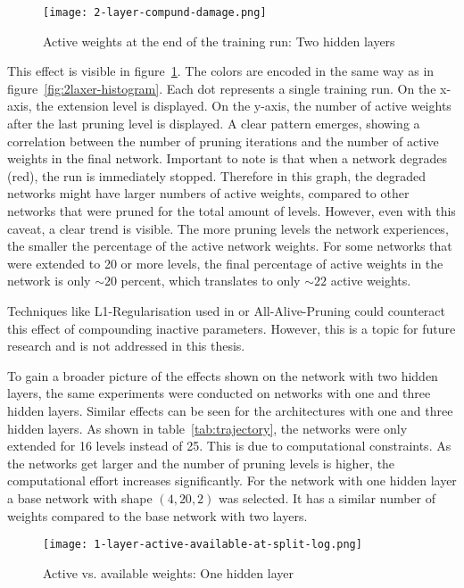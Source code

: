 \begin{figure}[ht]
    \centering
    \texttt{[image: 2-layer-compund-damage.png]}
    \caption{
        Active weights at the end of the training run: Two hidden layers
    }\label{fig:collateral_damage}
\end{figure}

This effect is visible in figure~\ref{fig:collateral_damage}.
The colors are encoded in the same way as in figure~\ref{fig:2laxer-histogram}.
Each dot represents a single training run. 
On the x-axis, the extension level is displayed.
On the y-axis, the number of active weights after the last pruning level is displayed.
A clear pattern emerges, showing a correlation between the number of pruning iterations and the number of active weights in the final network.
Important to note is that when a network degrades (red), the run is immediately stopped.
Therefore in this graph, the degraded networks might have larger numbers of active weights, compared to other networks that were pruned for the total amount of levels.
However, even with this caveat, a clear trend is visible.
The more pruning levels the network experiences, the smaller the percentage of the active network weights.
For some networks that were extended to 20 or more levels, the final percentage of active weights in the network is only $\sim20$ percent, which translates to only $\sim22$ active weights.

Techniques like L1-Regularisation used in \autocite{HanEtAl15} or All-Alive-Pruning \autocite{AllAlivePruning} could counteract this effect of compounding inactive parameters.
However, this is a topic for future research and is not addressed in this thesis. 

To gain a broader picture of the effects shown on the network with two hidden layers, the same experiments were conducted on networks with one and three hidden layers.
Similar effects can be seen for the architectures with one and three hidden layers.
As shown in table~\ref{tab:trajectory}, the networks were only extended for 16 levels instead of 25. 
This is due to computational constraints. 
As the networks get larger and the number of pruning levels is higher, the computational effort increases significantly.
For the network with one hidden layer a base network with shape $(4,20,2)$ was selected.
It has a similar number of weights compared to the base network with two layers.

\begin{figure}[ht]
    \centering
    \texttt{[image: 1-layer-active-available-at-split-log.png]}
    \caption{Active vs. available weights: One hidden layer
    }\label{fig:1layer-active}
\end{figure}

